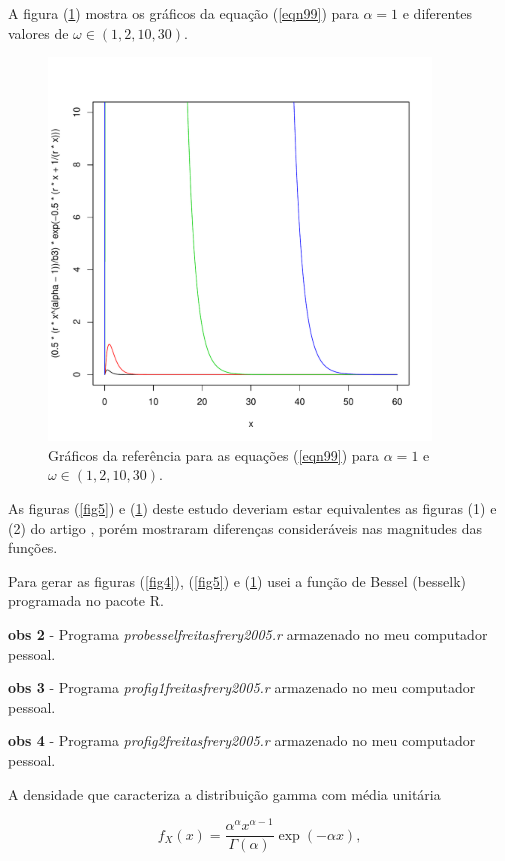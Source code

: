 \documentclass[12pt,a4paper]{article}
\begin{document}
A figura (\ref{fig6}) mostra os gráficos da equação (\ref{eqn99}) para $\alpha=1$ e diferentes valores de $\omega\in(1,2,10,30)$. 

\begin{figure}[!htb]
\centering
\includegraphics[width=4.0in]{fig2_freitas_frery_2005.pdf}
	\caption{Gráficos da referência \cite{freitas_frery_2005} para as equações (\ref{eqn99}) para $\alpha=1$ e $\omega\in(1,2,10,30)$.}
\label{fig6}
\end{figure}

	
As figuras (\ref{fig5}) e (\ref{fig6}) deste estudo deveriam estar equivalentes as figuras (1) e (2) do artigo \cite{freitas_frery_2005}, porém mostraram diferenças consideráveis nas magnitudes das funções. 

Para gerar as figuras (\ref{fig4}), (\ref{fig5}) e (\ref{fig6}) usei a função de Bessel (besselk) programada no pacote R.

{\bf obs 2} - Programa {\it probesselfreitasfrery2005.r} armazenado no meu computador pessoal.

{\bf obs 3} - Programa {\it profig1freitasfrery2005.r} armazenado no meu computador pessoal.

{\bf obs 4} - Programa {\it profig2freitasfrery2005.r} armazenado no meu computador pessoal.

A densidade que caracteriza a distribuição gamma com média unitária

\begin{equation}\label{eqn100}
	f_{X}(x)=\frac{\alpha^{\alpha}x^{\alpha-1}}{\Gamma(\alpha)}\exp\left(-\alpha x\right), 
\end{equation}
\end{document}
